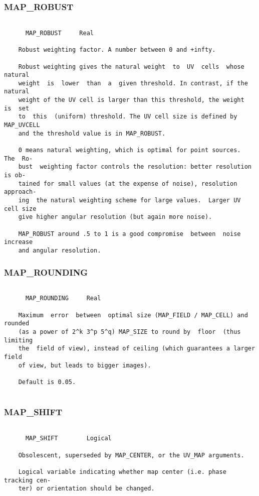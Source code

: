 \subsubsection{MAP\_ROBUST}
\begin{verbatim}

      MAP_ROBUST     Real

    Robust weighting factor. A number between 0 and +infty.

    Robust weighting gives the natural weight  to  UV  cells  whose  natural
    weight  is  lower  than  a  given threshold. In contrast, if the natural
    weight of the UV cell is larger than this threshold, the weight  is  set
    to  this  (uniform) threshold. The UV cell size is defined by MAP_UVCELL
    and the threshold value is in MAP_ROBUST.

    0 means natural weighting, which is optimal for point sources.  The  Ro-
    bust  weighting factor controls the resolution: better resolution is ob-
    tained for small values (at the expense of noise), resolution  approach-
    ing  the natural weighting scheme for large values.  Larger UV cell size
    give higher angular resolution (but again more noise).

    MAP_ROBUST around .5 to 1 is a good compromise  between  noise  increase
    and angular resolution.

\end{verbatim}
\subsubsection{MAP\_ROUNDING}
\begin{verbatim}

      MAP_ROUNDING     Real

    Maximum  error  between  optimal size (MAP_FIELD / MAP_CELL) and rounded
    (as a power of 2^k 3^p 5^q) MAP_SIZE to round by  floor  (thus  limiting
    the  field of view), instead of ceiling (which guarantees a larger field
    of view, but leads to bigger images).

    Default is 0.05.


\end{verbatim}
\subsubsection{MAP\_SHIFT}
\begin{verbatim}

      MAP_SHIFT        Logical

    Obsolescent, superseded by MAP_CENTER, or the UV_MAP arguments.

    Logical variable indicating whether map center (i.e. phase tracking cen-
    ter) or orientation should be changed.

\end{verbatim}
